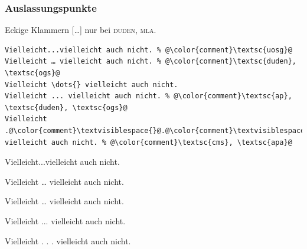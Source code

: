 \documentclass{beamer}
\begin{document}
\begin{frame}[fragile]
    \frametitle{Auslassungspunkte}
    Eckige Klammern [\dots{}] nur bei \textsc{duden}, \textsc{mla}.

    \pause

    \begin{lstlisting}[escapechar=\@]
Vielleicht...vielleicht auch nicht. % @\color{comment}\textsc{uosg}@
Vielleicht … vielleicht auch nicht. % @\color{comment}\textsc{duden}, \textsc{ogs}@
Vielleicht \dots{} vielleicht auch nicht.
Vielleicht ... vielleicht auch nicht. % @\color{comment}\textsc{ap}, \textsc{duden}, \textsc{ogs}@
Vielleicht .@\color{comment}\textvisiblespace{}@.@\color{comment}\textvisiblespace{}@. vielleicht auch nicht. % @\color{comment}\textsc{cms}, \textsc{apa}@
        \end{lstlisting}

    Vielleicht...vielleicht auch nicht.

    Vielleicht … vielleicht auch nicht.

    Vielleicht \dots{} vielleicht auch nicht.

    Vielleicht ... vielleicht auch nicht.

    Vielleicht . . . vielleicht auch nicht.\\[2ex]

\end{frame}
\end{document}
